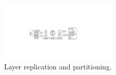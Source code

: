 \begin{figure}[t]
	\centering
	\centering
	\includegraphics[width=0.5\textwidth]{graphs/replication.pdf}
	\caption{Layer replication and partitioning. }
	\label{fig:replication-partition}
\end{figure}
